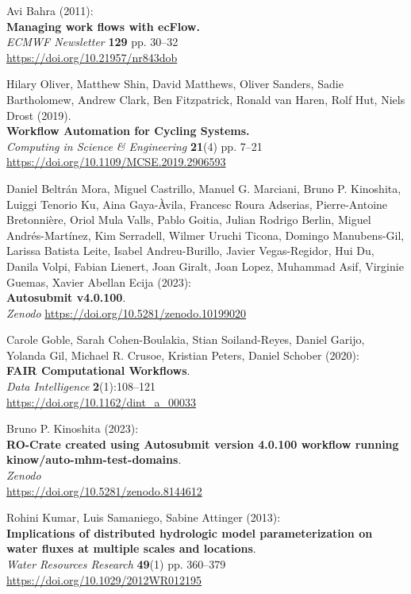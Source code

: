 \documentclass[10pt,letterpaper]{article}
\begin{document}
\begin{thebibliography}{10}
\begin{small}
Avi Bahra (2011):\\
\textbf{Managing work flows with ecFlow.}\\
\emph{ECMWF Newsletter} \textbf{129} pp. 30--32\\
\url{https://doi.org/10.21957/nr843dob}


Hilary Oliver, Matthew Shin, David Matthews, Oliver Sanders, Sadie Bartholomew, Andrew Clark, Ben Fitzpatrick, Ronald van Haren, Rolf Hut, Niels Drost
(2019).\\
\textbf{Workflow Automation for Cycling Systems.}\\
\emph{Computing in Science & Engineering} \textbf{21}(4) pp. 7--21
\url{https://doi.org/10.1109/MCSE.2019.2906593}


 Daniel Beltrán Mora, Miguel Castrillo, Manuel G. Marciani, Bruno P. Kinoshita, Luiggi Tenorio Ku, Aina Gaya-Àvila, Francesc Roura Adserias,  Pierre-Antoine Bretonnière, Oriol Mula Valls, Pablo Goitia, Julian Rodrigo Berlin,  Miguel Andrés-Martínez, Kim Serradell, Wilmer Uruchi Ticona,  Domingo Manubens-Gil, Larissa Batista Leite, Isabel Andreu-Burillo, Javier Vegas-Regidor, Hui Du, Danila Volpi, Fabian Lienert, Joan Giralt, Joan Lopez, Muhammad Asif, Virginie Guemas, Xavier Abellan Ecija (2023):\\
\textbf{Autosubmit v4.0.100}.\\
\emph{Zenodo}
\url{https://doi.org/10.5281/zenodo.10199020}


Carole Goble, Sarah Cohen-Boulakia, Stian Soiland-Reyes, Daniel Garijo, Yolanda Gil, Michael R. Crusoe, Kristian Peters, Daniel Schober (2020):\\
\textbf{FAIR Computational Workflows}.\\
\emph{Data Intelligence} \textbf{2}(1):108--121\\
\url{https://doi.org/10.1162/dint_a_00033}

Bruno P. Kinoshita (2023):\\
\textbf{RO-Crate created using Autosubmit version 4.0.100 workflow running kinow/auto-mhm-test-domains}.\\
\emph{Zenodo}\\
\url{https://doi.org/10.5281/zenodo.8144612}

 Rohini Kumar, Luis Samaniego, Sabine Attinger (2013):\\
\textbf{Implications of distributed hydrologic model parameterization on water fluxes at multiple scales and locations}.\\
\emph{Water Resources Research} \textbf{49}(1) pp. 360--379\\
\url{https://doi.org/10.1029/2012WR012195}


\end{small}
\end{thebibliography}
\end{document}
